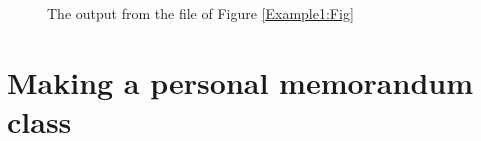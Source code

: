 \documentclass[12pt,a4paper]{article}
\newlength{\epspagewidth}
\begin{document}
\begin{figure}[p]
\caption{The output from the file of Figure \protect\ref{Example1:Fig}}
\label{Output:Fig}
\end{figure}

\section{Making a personal memorandum class}
\end{document}
